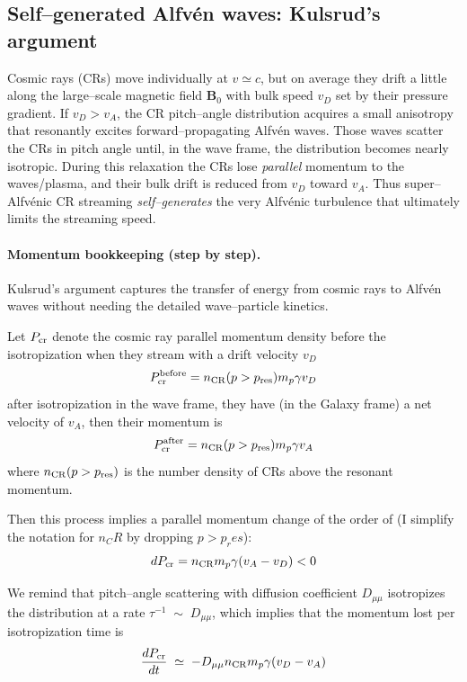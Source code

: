 \subsection{Self–generated Alfv\'en waves: Kulsrud’s argument}

Cosmic rays (CRs) move individually at \(v\simeq c\), but on average they drift a little along the large–scale magnetic field \(\mathbf B_0\) with bulk speed \(v_D\) set by their
pressure gradient. If \(v_D>v_A\), the CR pitch–angle distribution acquires a small anisotropy that resonantly excites forward–propagating Alfv\'en waves. Those waves
scatter the CRs in pitch angle until, in the wave frame, the distribution becomes nearly isotropic. During this relaxation the CRs lose \emph{parallel} momentum to the
waves/plasma, and their bulk drift is reduced from \(v_D\) toward \(v_A\). Thus super–Alfv\'enic CR streaming \emph{self–generates} the very Alfv\'enic turbulence
that ultimately limits the streaming speed.

\paragraph{Momentum bookkeeping (step by step).}

Kulsrud’s argument captures the transfer of energy from cosmic rays to Alfv\'en waves without needing the detailed wave–particle kinetics.

Let \(P_{\rm cr}\) denote the cosmic ray parallel momentum density before the isotropization when they stream with a drift velocity \( v_D \)
%
\[
P_{\rm cr}^{\rm before} = n_{\rm CR}(p > p_{\rm res}) m_p \gamma v_D
\]
after isotropization in the wave frame, they have (in the Galaxy frame) a net velocity of \(v_A\), then their momentum is
\[
P_{\rm cr}^{\rm after} = n_{\rm CR}(p > p_{\rm res}) m_p \gamma v_A
\]
%
where \( n_{\rm CR}(p > p_{\rm res}) \) is the number density of CRs above the resonant momentum.

Then this process implies a parallel momentum change of the order of (I simplify the notation for \( n_CR \) by dropping \( p > p_res \)):
%
\[
dP_{\rm cr} = n_{\rm CR} m_p \gamma (v_A - v_D) < 0
\]

We remind that pitch–angle scattering with diffusion coefficient \(D_{\mu\mu}\) isotropizes
the distribution at a rate \( \tau^{-1} \;\sim\; D_{\mu\mu} \), which implies that the momentum lost per isotropization time is 
\[
\frac{dP_{\rm cr}}{dt}\;\simeq\; -  D_{\mu\mu}  n_{\rm CR} m_p \gamma (v_D - v_A)
\]

